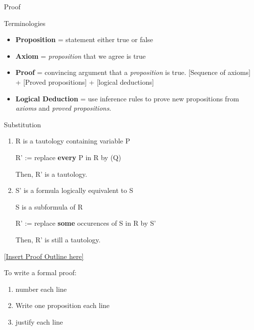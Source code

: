 \documentclass{alittlebear}
\begin{document}
\begin{unit}{Proof}{}
    \begin{mathnote}{Terminologies}
    \begin{itemize}
        \item \textbf{Proposition} = statement either true or false
        \item \textbf{Axiom} = \textit{proposition} that we agree is true
        \item \textbf{Proof} = convincing argument that a \textit{proposition} is true. [Sequence of axioms] + [Proved propositions] + [logical deductions]
        \item \textbf{Logical Deduction} = use inference rules to prove new propositions from \textit{axioms} and \textit{proved propositions}.
    \end{itemize}
    \qbreak
        \begin{mathnote}{Substitution}
            \begin{enumerate}
                \item R is a tautology containing variable P

                        R' := replace \textbf{every} P in R by (Q)
            
                        Then, R' is a tautology.
                \item S' is a formula logically equivalent to S

                S is a subformula of R

                R' := replace \textbf{some} occurences of S in R by S'

                Then, R' is still a tautology.
            \end{enumerate}
        \end{mathnote}

        \begin{mathnote}
            \hyperlink{https://q.utoronto.ca/courses/337079/files/29579125?wrap=1}{[Insert Proof Outline here]}
        \end{mathnote}
        
    \end{mathnote}
    \begin{note}
        To write a formal proof:
        \begin{enumerate}
            \item number each line
            \item  Write one proposition each line
            \item  justify each line
        \end{enumerate}
    \end{note}
\end{unit}
\end{document}
